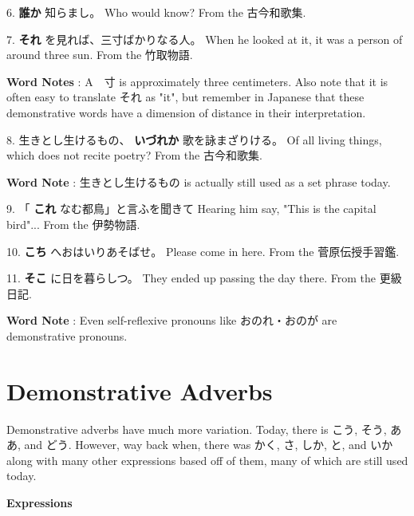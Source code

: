 \par{6. \textbf{誰か }知らまし。 \hfill\break
Who would know? \hfill\break
From the 古今和歌集. }

\par{7. \textbf{それ }を見れば、三寸ばかりなる人。 \hfill\break
When he looked at it, it was a person of around three sun. \hfill\break
From the 竹取物語. }

\par{\textbf{Word Notes }: A　寸 is approximately three centimeters. Also note that it is often easy to translate それ as "it", but remember in Japanese that these demonstrative words have a dimension of distance in their interpretation. }

\par{8. 生きとし生けるもの、 \textbf{いづれか }歌を詠まざりける。 \hfill\break
Of all living things, which does not recite poetry? \hfill\break
From the 古今和歌集. }

\par{\textbf{Word Note }: 生きとし生けるもの is actually still used as a set phrase today. }

\par{9. 「 \textbf{これ }なむ都鳥」と言ふを聞きて \hfill\break
Hearing him say, "This is the capital bird"\dothyp{}\dothyp{}\dothyp{} \hfill\break
From the 伊勢物語. }

\par{10. \textbf{こち }へおはいりあそばせ。 \hfill\break
Please come in here. \hfill\break
From the 菅原伝授手習鑑. }

\par{11. \textbf{そこ }に日を暮らしつ。 \hfill\break
They ended up passing the day there. \hfill\break
From the 更級日記. }

\par{\textbf{Word Note }: Even self-reflexive pronouns like おのれ・おのが are demonstrative pronouns. }
      
\section{Demonstrative Adverbs}
 
\par{Demonstrative adverbs have much more variation. Today, there is こう, そう, ああ, and どう. However, way back when, there was かく, さ, しか, と, and いか along with many other expressions based off of them, many of which are still used today. }

\begin{center}
 \textbf{Expressions }
\end{center}

